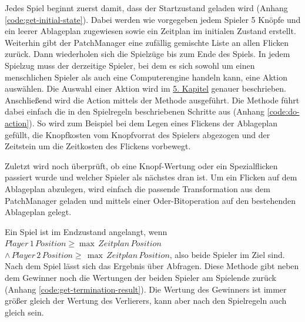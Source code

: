 Jedes Spiel beginnt zuerst damit, dass der Startzustand geladen wird (Anhang \ref{code:get-initial-state}). Dabei werden wie vorgegeben jedem Spieler 5 Knöpfe und ein leerer Ablageplan zugewiesen sowie ein Zeitplan im initialen Zustand erstellt. Weiterhin gibt der PatchManager eine zufällig gemischte Liste an allen Flicken zurück. Dann wiederholen sich die Spielzüge bis zum Ende des Spiels. In jedem Spielzug muss der derzeitige Spieler, bei dem es sich sowohl um einen menschlichen Spieler als auch eine Computerengine handeln kann, eine Aktion auswählen. Die Auswahl einer Aktion wird im \hyperref[chapter:erstellung-der-computerspielengines]{5. Kapitel} genauer beschrieben. Anschließend wird die Action mittels der Methode  ausgeführt. Die Methode führt dabei einfach die in den Spielregeln beschriebenen Schritte aus (Anhang \ref{code:do-action}). So wird zum Beispiel bei dem Legen eines Flickens der Ablageplan gefüllt, die Knopfkosten vom Knopfvorrat des Spielers abgezogen und der Zeitstein um die Zeitkosten des Flickens vorbewegt.

Zuletzt wird noch überprüft, ob eine Knopf-Wertung oder ein Spezialflicken passiert wurde und welcher Spieler als nächstes dran ist. Um ein Flicken auf dem Ablageplan abzulegen, wird einfach die passende Transformation aus dem PatchManager geladen und mittels einer Oder-Bitoperation auf den bestehenden Ablageplan gelegt.

Ein Spiel ist im Endzustand angelangt, wenn $Player\, 1\, Position \ge \max\, Zeitplan\, Position$ $\wedge\, Player\, 2\, Position \ge\, \max\, Zeitplan\, Position$, also beide Spieler im Ziel sind. Nach dem Spiel lässt sich das Ergebnis über  Abfragen. Diese Methode gibt neben dem Gewinner noch die Wertungen der beiden Spieler am Spielende zurück (Anhang \ref{code:get-termination-result}). Die Wertung des Gewinners ist immer größer gleich der Wertung des Verlierers, kann aber nach den Spielregeln auch gleich sein.

